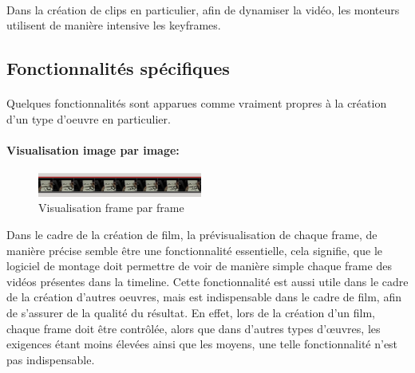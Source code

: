 \paragraph{}

Dans la création de clips en particulier, afin de dynamiser la vidéo,
les monteurs utilisent de manière intensive les keyframes.

\subsection{Fonctionnalités spécifiques}

\paragraph{}

Quelques fonctionnalités sont apparues comme vraiment propres à la création
d'un type d'oeuvre en particulier.

\paragraph{Visualisation image par image:}

\begin{figure}
    \begin{center}
      \includegraphics[width=0.48\textwidth]{images/frameByFrame}
    \end{center} \caption{Visualisation frame par frame} \label{Yes}
\end{figure}

Dans le cadre de la création de film, la prévisualisation de chaque frame,
de manière précise semble être une fonctionnalité essentielle,
cela signifie, que le logiciel de montage doit permettre de
voir de manière simple chaque frame des vidéos présentes dans la
timeline. Cette fonctionnalité est aussi utile dans le cadre de
la création d'autres oeuvres, mais est indispensable dans le cadre
de film, afin de s'assurer de la qualité du résultat. En effet,
lors de la création d'un film, chaque frame doit être contrôlée,
alors que dans d'autres types d'œuvres, les exigences étant moins
élevées ainsi que les moyens, une telle fonctionnalité n'est pas
indispensable.

